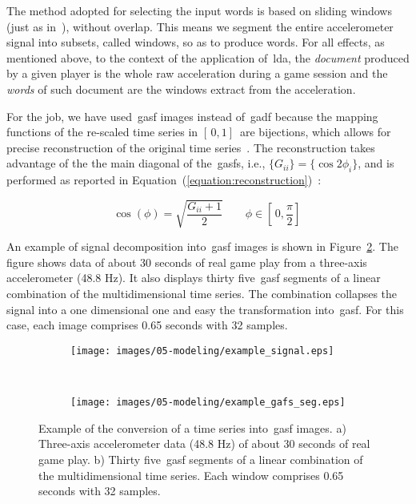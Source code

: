 The method adopted for selecting the input words is based on sliding windows (just as in~\cite{smith_mining_2016}), without overlap. This means we segment the entire accelerometer signal into subsets, called windows, so as to produce words. For all effects, as mentioned above, to the context of the application of~\gls{lda}, the \textit{document} produced by a given player is the whole raw acceleration during a game session and the \textit{words} of such document are the windows extract from the acceleration.

For the job, we have used~\gls{gasf} images instead of~\gls{gadf} because the mapping functions of the re-scaled time series in $[\,0,1]\,$ are bijections, which allows for precise reconstruction of the original time series~\citep{wang_imaging_2015}. The reconstruction takes advantage of the the main diagonal of the~\gls{gasf}s, i.e., $\{G_{ii}\} = \{\cos{2\phi_{i}}\}$, and is performed as reported in Equation~(\ref{equation:reconstruction})~\cite{wang_imaging_2015}:

\begin{equation}\label{equation:reconstruction}
    \cos(\phi)=\sqrt{\frac{G_{ii}+1}{2}} \qquad \phi \in [\,0,\frac{\pi}{2}]\,
\end{equation}

An example of signal decomposition into~\gls{gasf} images is shown in Figure~\ref{fig:acc_signal_gasfs}. The figure shows data of about 30 seconds of real game play from a three-axis accelerometer (48.8 Hz). It also displays thirty five~\gls{gasf} segments of a linear combination of the multidimensional time series. The combination collapses the signal into a one dimensional one and easy the transformation into~\gls{gasf}. For this case, each image comprises 0.65 seconds with 32 samples.

\begin{figure}[H]
    \centering
    \begin{subfigure}[h]{\textwidth}
        \centering
        \texttt{[image: images/05-modeling/example\_signal.eps]}
        \label{figure:accelerometer_signal}
        \caption{}
    \end{subfigure} \vspace{-6pt}
    ~
    \begin{subfigure}[h]{0.8\textwidth}
        \centering
        \texttt{[image: images/05-modeling/example\_gafs\_seg.eps]}
        \caption{}
    \end{subfigure} \vspace{-6pt}
    \caption{Example of the conversion of a time series into~\gls{gasf} images. a) Three-axis accelerometer data (48.8 Hz) of about 30 seconds of real game play. b) Thirty five~\gls{gasf} segments of a linear combination of the multidimensional time series. Each window comprises 0.65 seconds with 32 samples.}
    \label{fig:acc_signal_gasfs}
\end{figure}

